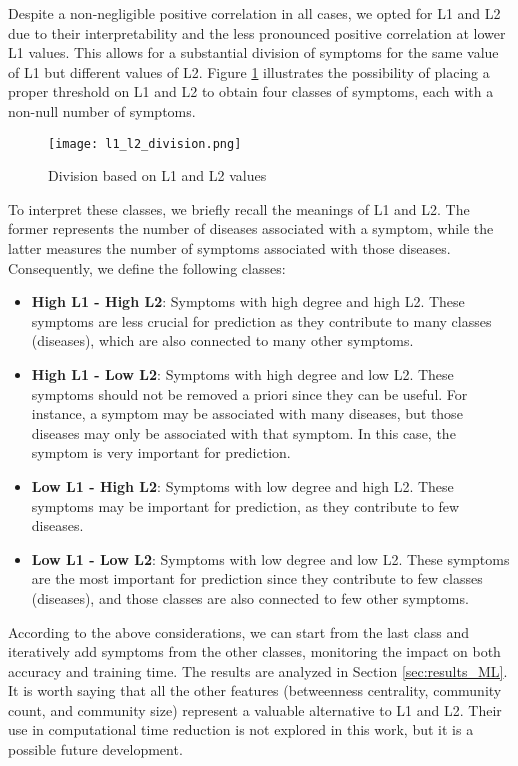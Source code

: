 \noindent
Despite a non-negligible positive correlation in all cases, we opted for L1 and L2 due to their interpretability and
the less pronounced positive correlation at lower L1 values. This allows for a substantial division of symptoms for
the same value of L1 but different values of L2. Figure \ref{fig:l1_l2_division} illustrates the possibility of
placing a proper threshold on L1 and L2 to obtain four classes of symptoms, each with a non-null number of symptoms.

\begin{figure}[H]
    \centering
    \texttt{[image: l1\_l2\_division.png]}
    \caption{Division based on L1 and L2 values}
    \label{fig:l1_l2_division}
\end{figure}
\noindent
To interpret these classes, we briefly recall the meanings of L1 and L2. The former represents the number of diseases
associated with a symptom, while the latter measures the number of symptoms associated with those diseases.
Consequently, we define the following classes:\\

\begin{itemize}
    \setlength\itemsep{1em}
    \item \textbf{High L1 - High L2}: Symptoms with high degree and high L2. These symptoms are less crucial for
          prediction as they contribute to many classes (diseases), which are also connected to many other symptoms.
    \item \textbf{High L1 - Low L2}: Symptoms with high degree and low L2. These symptoms should not be removed a
          priori since they can be useful. For instance, a symptom may be associated with many diseases, but those
          diseases may only be associated with that symptom. In this case, the symptom is very important for prediction.
    \item \textbf{Low L1 - High L2}: Symptoms with low degree and high L2. These symptoms may be important for
          prediction, as they contribute to few diseases.
    \item \textbf{Low L1 - Low L2}: Symptoms with low degree and low L2. These symptoms are the most important
          for prediction since they contribute to few classes (diseases), and those classes are also connected to
          few other symptoms.
\end{itemize}
\vspace{0.4cm}
\noindent
According to the above considerations, we can start from the last class and iteratively add symptoms from the
other classes, monitoring the impact on both accuracy and training time.
The results are analyzed in Section \ref{sec:results_ML}.\\
It is worth saying that all the other features (betweenness centrality, community count, and community size)
represent a valuable alternative to L1 and L2. Their use in computational time reduction is not explored in this work,
but it is a possible future development.




